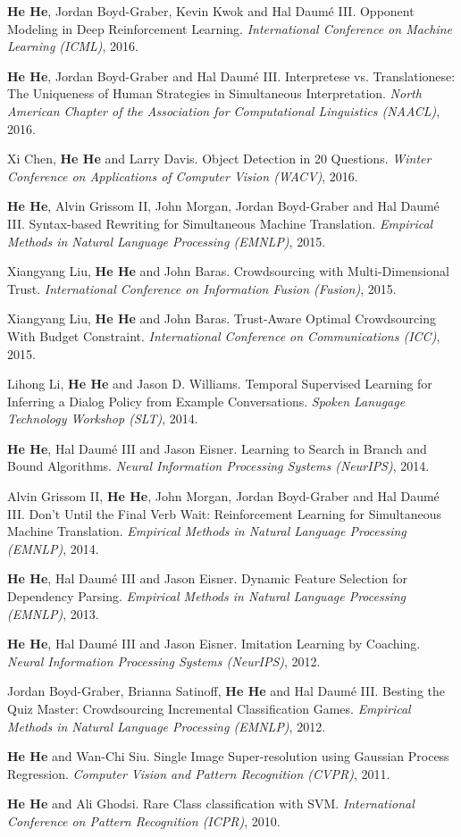 \textbf{He He}, Jordan Boyd-Graber, Kevin Kwok and Hal Daum\'e III. Opponent Modeling in Deep Reinforcement Learning. \textit{International Conference on Machine Learning (ICML)}, 2016.

\textbf{He He}, Jordan Boyd-Graber and Hal Daum\'e III. Interpretese vs. Translationese: The Uniqueness of Human Strategies in Simultaneous Interpretation. \textit{North American Chapter of the Association for Computational Linguistics (NAACL)}, 2016.

Xi Chen, \textbf{He He} and Larry Davis. Object Detection in 20 Questions. \textit{Winter Conference on Applications of Computer Vision (WACV)}, 2016.

\textbf{He He}, Alvin Grissom II, John Morgan, Jordan Boyd-Graber and Hal Daum\'e III. Syntax-based Rewriting for Simultaneous Machine Translation. \textit{Empirical Methods in Natural Language Processing (EMNLP)}, 2015.

Xiangyang Liu, \textbf{He He} and John Baras. Crowdsourcing with Multi-Dimensional Trust. \textit{International Conference on Information Fusion (Fusion)}, 2015.

Xiangyang Liu, \textbf{He He} and John Baras. Trust-Aware Optimal Crowdsourcing With Budget Constraint. \textit{International Conference on Communications (ICC)}, 2015.

Lihong Li, \textbf{He He} and Jason D. Williams. Temporal Supervised Learning for Inferring a Dialog Policy from Example Conversations. \textit{Spoken Lanugage Technology Workshop (SLT)}, 2014.

\textbf{He He}, Hal Daum\'e III and Jason Eisner. Learning to Search in Branch and Bound Algorithms. \textit{Neural Information Processing Systems (NeurIPS)}, 2014.

Alvin Grissom II, \textbf{He He}, John Morgan, Jordan Boyd-Graber and Hal Daum\'e III. Don't Until the Final Verb Wait: Reinforcement Learning for Simultaneous Machine Translation. \textit{Empirical Methods in Natural Language Processing (EMNLP)}, 2014.

\textbf{He He}, Hal Daum\'e III and Jason Eisner. Dynamic Feature Selection for Dependency Parsing. \textit{Empirical Methods in Natural Language Processing (EMNLP)}, 2013.

\textbf{He He}, Hal Daum\'e III and Jason Eisner. Imitation Learning by Coaching. \textit{Neural Information Processing Systems (NeurIPS)}, 2012.

Jordan Boyd-Graber, Brianna Satinoff, \textbf{He He} and Hal Daum\'e III. Besting the Quiz Master: Crowdsourcing Incremental Classification Games. \textit{Empirical Methods in Natural Language Processing (EMNLP)}, 2012.

\textbf{He He} and Wan-Chi Siu. Single Image Super-resolution using Gaussian Process Regression. \textit{Computer Vision and Pattern Recognition (CVPR)}, 2011.

\textbf{He He} and Ali Ghodsi. Rare Class classification with SVM. \textit{International Conference on Pattern Recognition (ICPR)}, 2010.

